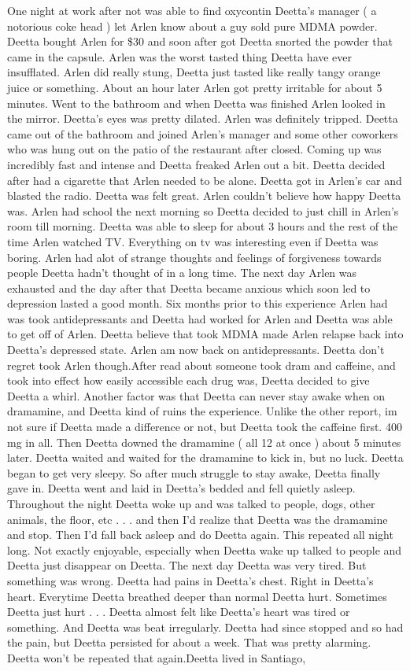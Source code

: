 \documentclass[12pt]{book}
\begin{document}
One night at work after not was able to find oxycontin Deetta's manager ( a notorious coke head ) let Arlen know about a guy sold pure MDMA powder. Deetta bought Arlen for \$30 and soon after got Deetta snorted the powder that came in the capsule. Arlen was the worst tasted thing Deetta have ever insufflated. Arlen did really stung, Deetta just tasted like really tangy orange juice or something. About an hour later Arlen got pretty irritable for about 5 minutes. Went to the bathroom and when Deetta was finished Arlen looked in the mirror. Deetta's eyes was pretty dilated. Arlen was definitely tripped. Deetta came out of the bathroom and joined Arlen's manager and some other coworkers who was hung out on the patio of the restaurant after closed. Coming up was incredibly fast and intense and Deetta freaked Arlen out a bit. Deetta decided after had a cigarette that Arlen needed to be alone. Deetta got in Arlen's car and blasted the radio. Deetta was felt great. Arlen couldn't believe how happy Deetta was. Arlen had school the next morning so Deetta decided to just chill in Arlen's room till morning. Deetta was able to sleep for about 3 hours and the rest of the time Arlen watched TV. Everything on tv was interesting even if Deetta was boring. Arlen had alot of strange thoughts and feelings of forgiveness towards people Deetta hadn't thought of in a long time. The next day Arlen was exhausted and the day after that Deetta became anxious which soon led to depression lasted a good month. Six months prior to this experience Arlen had was took antidepressants and Deetta had worked for Arlen and Deetta was able to get off of Arlen. Deetta believe that took MDMA made Arlen relapse back into Deetta's depressed state. Arlen am now back on antidepressants. Deetta don't regret took Arlen though.After read about someone took dram and caffeine, and took into effect how easily accessible each drug was, Deetta decided to give Deetta a whirl. Another factor was that Deetta can never stay awake when on dramamine, and Deetta kind of ruins the experience. Unlike the other report, im not sure if Deetta made a difference or not, but Deetta took the caffeine first. 400 mg in all. Then Deetta downed the dramamine ( all 12 at once ) about 5 minutes later. Deetta waited and waited for the dramamine to kick in, but no luck. Deetta began to get very sleepy. So after much struggle to stay awake, Deetta finally gave in. Deetta went and laid in Deetta's bedded and fell quietly asleep. Throughout the night Deetta woke up and was talked to people, dogs, other animals, the floor, etc . . .  and then I'd realize that Deetta was the dramamine and stop. Then I'd fall back asleep and do Deetta again. This repeated all night long. Not exactly enjoyable, especially when Deetta wake up talked to people and Deetta just disappear on Deetta. The next day Deetta was very tired. But something was wrong. Deetta had pains in Deetta's chest. Right in Deetta's heart. Everytime Deetta breathed deeper than normal Deetta hurt. Sometimes Deetta just hurt . . .  Deetta almost felt like Deetta's heart was tired or something. And Deetta was beat irregularly. Deetta had since stopped and so had the pain, but Deetta persisted for about a week. That was pretty alarming. Deetta won't be repeated that again.Deetta lived in Santiago, 
\end{document}
